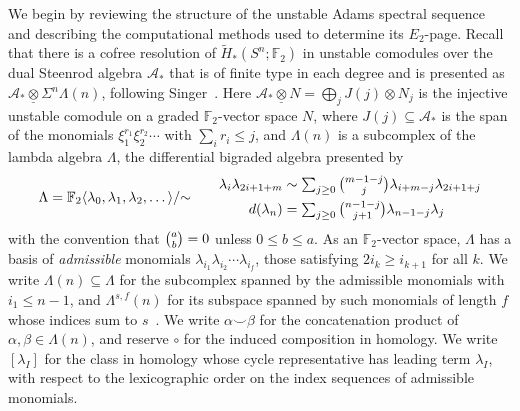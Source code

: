 \documentclass[dvipsnames,table]{amsart}
\theoremstyle{definition}
\theoremstyle{remark}
\numberwithin{equation}{section}
\begin{document}
\noindent We begin by reviewing the structure of the unstable Adams spectral sequence and describing the computational methods used to determine its $E_2$-page. Recall that there is a cofree resolution of $\tilde{H}_{\ast}(S^n; \mathbb{F}_2)$ in unstable comodules over the dual Steenrod algebra $\mathcal{A}_*$ that is of finite type in each degree and is presented as $\mathcal{A}_* \underline{\otimes} \Sigma^n \Lambda(n)$, following Singer~\cite{Singer_1975}. Here $\mathcal{A}_* \underline{\otimes} N = \bigoplus_j J(j) \otimes N_j$ is the injective unstable comodule on a graded $\mathbb{F}_2$-vector space $N$, where $J(j) \subseteq \mathcal{A}_*$ is the span of the monomials $\xi_1^{r_1} \xi_2^{r_2} \cdots$ with $\sum_i r_i \leq j$,
and $\Lambda(n)$ is a subcomplex of the lambda algebra $\Lambda$, the differential bigraded algebra presented by
\begin{equation}
  \label{eq:lambda}
  \Lambda = \mathbb{F}_2\langle \lambda_0, \lambda_1, \lambda_2, \dots\rangle / \mathord{\sim}
  \qquad
  \begin{aligned}
    \lambda_i \lambda_{2i+1+m}
      &\sim \textstyle\sum_{j\ge0} \tbinom{m-1-j}{j} \lambda_{i+m-j} \lambda_{2i+1+j} \\
    d(\lambda_n)
      &= \textstyle\sum_{j\ge0} \tbinom{n-1-j}{j+1} \lambda_{n-1-j} \lambda_j 
  \end{aligned}
\end{equation}
with the convention that $\tbinom{a}{b} = 0$ unless $0 \le b \le a$. As an $\mathbb{F}_2$-vector space, $\Lambda$ has a basis of \emph{admissible} monomials $\lambda_{i_1}\lambda_{i_2}\cdots\lambda_{i_f}$, those satisfying $2 i_k \geq i_{k+1}$ for all $k$. We write $\Lambda(n) \subseteq \Lambda$ for the subcomplex spanned by the admissible monomials with $i_1 \leq n - 1$, and $\Lambda^{s,f}(n)$ for its subspace spanned by such monomials of length $f$ whose indices sum to $s$~\cite{Singer_1975}. We write $\alpha \smallsmile \beta$ for the concatenation product of $\alpha, \beta \in \Lambda(n)$, and reserve $\circ$ for the induced composition in homology. We write $[\lambda_I]$ for the class in homology whose cycle representative has leading term $\lambda_I$, with respect to the lexicographic order on the index sequences of admissible monomials.
\end{document}
